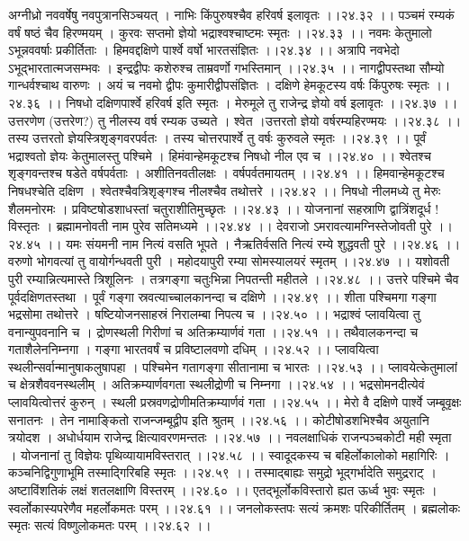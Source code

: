 \documentclass[11pt]{book}
\begin{document}
\begin{landscape}
अग्नीध्रो नववर्षेषु नवपुत्रानसिञ्चयत् ।
नाभिः किंपुरुषश्चैव हरिवर्ष इलावृतः ।।२४.३२ ।।
पञ्चमं रम्यकं वर्षं षष्ठं चैव हिरण्मयम् ।
कुरवः सप्तमो ज्ञेयो भद्राश्वश्चाष्टमः स्मृतः ।।२४.३३ ।।
नवमः केतुमालो ऽभून्नववर्षाः प्रकीर्तिताः ।
हिमवद्दक्षिणे पार्श्वे वर्षो भारतसंज्ञितः ।।२४.३४ ।।
अत्रापि नवभेदो ऽभूद्भारतात्मजसम्भवः ।
इन्द्रद्वीपः कशेरुश्च ताम्रवर्णो गभस्तिमान् ।।२४.३५ ।।
नागद्वीपस्तथा सौम्यो गान्धर्वश्चाथ वारुणः ।
अयं च नवमो द्वीपः कुमारीद्वीपसंज्ञितः ।
दक्षिणे हेमकूटस्य वर्षः किंपुरुषः स्मृतः ।।२४.३६ ।।
निषधो दक्षिणपार्श्वे हरिवर्ष इति स्मृतः ।
मेरुमूले तु राजेन्द्र ज्ञेयो वर्ष इलावृतः ।।२४.३७ ।।
उत्तरणेण (उत्तरेण?) तु नीलस्य वर्ष रम्यक उच्यते ।
श्वेत ।उत्तरतो ज्ञेयो वर्षरम्यहिरण्मयः ।।२४.३८ ।।
तस्य उत्तरतो ज्ञेयस्त्रिशृङ्गवरपर्वतः ।
तस्य चोत्तरपार्श्वे तु वर्षः कुरुवले स्मृतः ।।२४.३९ ।।
पूर्वं भद्राश्वतो ज्ञेयः केतुमालस्तु पश्चिमे ।
हिमंवान्हेमकूटश्च निषधो नील एव च ।।२४.४० ।।
श्वेतश्च शृङ्गवन्तश्च षडेते वर्षपर्वताः ।
अशीतिनवतीलक्षः  । वर्षपर्वतमायतम् ।।२४.४१ ।।
हिमवान्हेमकूटश्च निषधश्चेति दक्षिण ।
श्वेतश्चैवत्रिशृङ्गश्च नीलश्चैव तथोत्तरे ।।२४.४२ ।।
निषधो नीलमध्ये तु मेरुः शैलमनोरमः ।
प्रविष्टषोडशाधस्तां चतुराशीतिमुच्छृतः ।।२४.४३ ।।
योजनानां सहस्राणि द्वात्रिंशदूर्ध ! विस्तृतः ।
ब्रह्मामनोवती नाम पुरेव सतिमध्यमे ।।२४.४४ ।।
देवराजो ऽमरावत्यामग्निस्तेजोवती पुरे ।।२४.४५ ।।
यमः संयमनी नाम नित्यं वसति भूपते ।
नैऋतिर्वसति नित्यं रम्ये शुद्धवती पुरे ।।२४.४६ ।।
वरुणो भोगवत्यां तु वायोर्गन्धवती पुरी ।
महोदयापुरी रम्या सोमस्यालयरं स्मृतम् ।।२४.४७ ।।
यशोवती पुरी रम्यान्नित्यमास्ते त्रिशूलिनः ।
तत्रगङ्गा चतुःभिन्ना निपतन्ती महीतले ।।२४.४८ ।।
उत्तरे पश्चिमे चैव पूर्वदक्षिणतस्तथा ।
पूर्वं गङ्गा स्रवत्याच्चालकानन्दा च दक्षिणे ।।२४.४९ ।।
शीता पश्चिमगा गङ्गा भद्रसोमा तथोत्तरे ।
षष्टियोजनसाहस्रं निरालम्बा निपत्य च ।।२४.५० ।।
भद्राश्वं प्लावयित्वा तु वनान्युपवनानि च ।
द्रोणस्थली गिरीणां च अतिक्रम्यार्णवं गता ।।२४.५१ ।।
तथैवालकनन्दा च गताशैलेननिम्नगा ।
गङ्गा भारतवर्षं च प्रविष्टालवणो दधिम् ।।२४.५२ ।।
प्लावयित्वा स्थलीन्सर्वान्मानुषाकलुषापहा ।
पश्चिमेन गतागङ्गा सीतानामा च भारतः ।।२४.५३ ।।
प्लावयेत्केतुमालां च क्षेत्रशैववनस्थलीम् ।
अतिक्रम्यार्णवगता स्थलीद्रोणी च निम्नगा ।।२४.५४ ।।
भद्रसोमनदीत्येवं प्लावयित्वोत्तरं कुरुन् ।
स्थली प्रस्रवणद्रोणीमतिक्रम्यार्णवं गता ।।२४.५५ ।।
मेरो वै दक्षिणे पार्श्वे जम्बूवृक्षः सनातनः ।
तेन नामाङ्कितो राजन्जम्बूद्वीप इति श्रुतम् ।।२४.५६ ।।
कोटीषोडशभिश्चैव अयुतानि त्रयोदश ।
अधोर्धयाम राजेन्द्र क्षित्यावरणमन्ततः ।।२४.५७ ।।
नवलक्षाधिकं राजन्पञ्चकोटी मही स्मृता ।
योजनानां तु विज्ञेयः पृथिव्यायामविस्तरात् ।।२४.५८ ।।
स्वादूदकस्य च बहिर्लोकालोको महागिरिः ।
कञ्चनिद्विगुणाभूमि तस्माद्गिरिबहि स्मृतः ।।२४.५९ ।।
तस्माद्बाह्यः समुद्रो भूद्गर्भादेति समुद्रराट् ।
अष्टाविंशतिकं लक्षं शतलक्षाणि विस्तरम् ।।२४.६० ।।
एतद्भूर्लोकविस्तारो ह्यत ऊर्ध्व भुवः स्मृतः ।
स्वर्लोकास्यपरेणैव महर्लोकमतः परम् ।।२४.६१ ।।
जनलोकस्तपः सत्यं क्रमशः परिकीर्तितम् ।
ब्रह्मलोकः स्मृतः सत्यं विष्णुलोकमतः परम् ।।२४.६२ ।।


\end{landscape}
\end{document}
